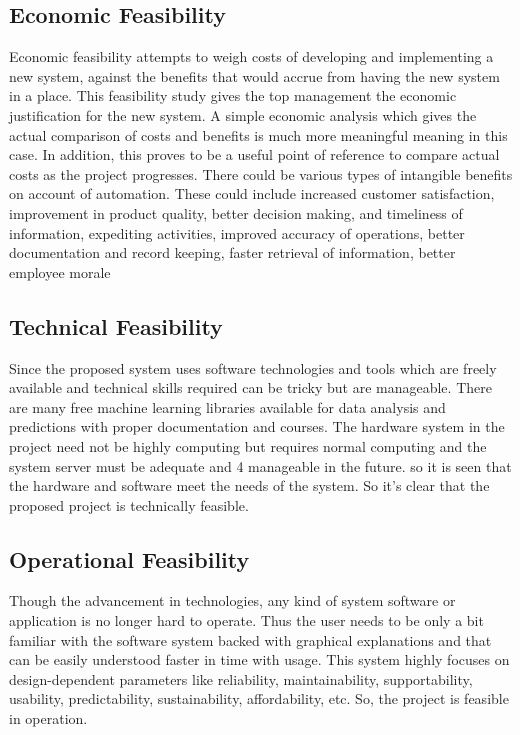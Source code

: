 \subsection{Economic Feasibility}
Economic feasibility attempts to weigh costs of developing and implementing a new 
system, against the benefits that would accrue from having the new system in a place. 
This feasibility study gives the top management the economic justification for the new 
system. A simple economic analysis which gives the actual comparison of costs and 
benefits is much more meaningful meaning in this case. In addition, this proves to be a 
useful point of reference to compare actual costs as the project progresses. There could 
be various types of intangible benefits on account of automation. These could include 
increased customer satisfaction, improvement in product quality, better decision 
making, and timeliness of information, expediting activities, improved accuracy of 
operations, better documentation and record keeping, faster retrieval of information, 
better employee morale
\subsection{Technical Feasibility}
 Since the proposed system uses software technologies and tools which are freely 
available and technical skills required can be tricky but are manageable. There are many 
free machine learning libraries available for data analysis and predictions with proper 
documentation and courses. The hardware system in the project need not be highly 
computing but requires normal computing and the system server must be adequate and 
4
manageable in the future. so it is seen that the hardware and software meet the needs of 
the system. So it’s clear that the proposed project is technically feasible.
\subsection{Operational Feasibility}
Though the advancement in technologies, any kind of system software or application is 
no longer hard to operate. Thus the user needs to be only a bit familiar with the software 
system backed with graphical explanations and that can be easily understood faster in 
time with usage. This system highly focuses on design-dependent parameters like 
reliability, maintainability, supportability, usability, predictability, sustainability, 
affordability, etc. So, the project is feasible in operation.
